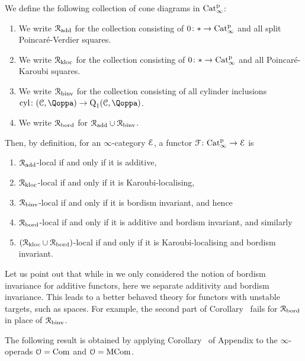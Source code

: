 \begin{definition}
\label{def:collections-R}%
We define the following collection of cone diagrams in $\mathrm{Cat}^{\mathrm p}_\infty$:
\begin{enumerate}
\item We write $\mathcal{R}_{\mathrm{add}}$ for the collection consisting of $0 \colon \ast \rightarrow \mathrm{Cat}^{\mathrm p}_\infty$ and all split Poincaré-Verdier squares.
\item We write $\mathcal{R}_{\mathrm{kloc}}$ for the collection consisting of $0 \colon \ast \rightarrow \mathrm{Cat}^{\mathrm p}_\infty$ and all Poincaré-Karoubi squares.
\item We write $\mathcal{R}_{\mathrm{binv}}$ for the collection consisting of all cylinder inclusions $\cyl\colon (\C,\QF) \to \Q_1(\C,\QF)$.
\item We write $\mathcal{R}_{\mathrm{bord}}$ for $\mathcal{R}_{\mathrm{add}} \cup \mathcal{R}_{\mathrm{binv}}$.
\end{enumerate}
\end{definition}


Then, by definition, for an $\infty$-category $\mathcal{E}$, %
a functor $\mathcal{F}\colon \mathrm{Cat}^{\mathrm p}_\infty \to \mathcal{E}$ is
\begin{enumerate}
\item $\mathcal{R}_{\mathrm{add}}$-local if and only if it is additive,
\item $\mathcal{R}_{\mathrm{kloc}}$-local if and only if it is Karoubi-localising,
\item $\mathcal{R}_{\mathrm{binv}}$-local if and only if it is bordism invariant, and hence
\item $\mathcal{R}_{\mathrm{bord}}$-local if and only if it is additive and bordism invariant, and similarly
\item $(\mathcal{R}_{\mathrm{kloc}} \cup \mathcal{R}_{\mathrm{bord}})$-local if and only if it is Karoubi-localising and bordism invariant.
\end{enumerate}

\begin{remark}
\label{remark:binv-is-not-add}%
Let us point out that while in \papertwo we only considered the notion of bordism invariance for additive functors, here we separate additivity and bordism invariance. This leads to a better behaved theory for functors with unstable targets, such as spaces. For example,  
the second part of Corollary~ fails for $\mathcal{R}_{\mathrm{bord}}$ in place of $\mathcal{R}_{\mathrm{binv}}$.
\end{remark}



The following result is obtained by applying 
Corollary~ 
of Appendix  
to the $\infty$-operads $\mathcal{O}=\mathrm{Com}$ and $\mathcal{O}=\mathrm{MCom}$. %



